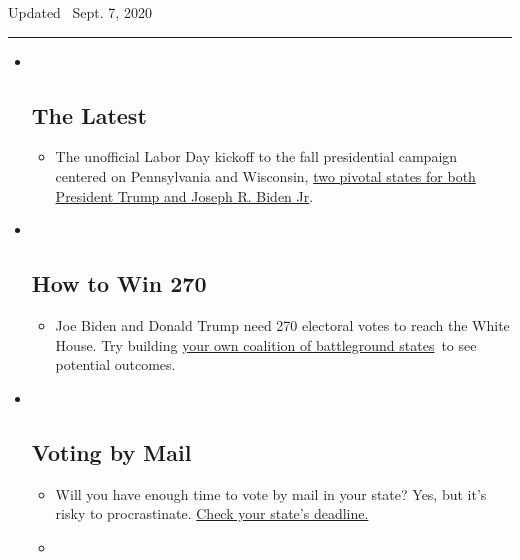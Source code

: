Updated ~Sept. 7, 2020

\begin{center}\rule{0.5\linewidth}{\linethickness}\end{center}

\begin{itemize}
\item ~
  \hypertarget{the-latest}{%
  \subsection{The Latest}\label{the-latest}}

  \begin{itemize}
  \item
    The unofficial Labor Day kickoff to the fall presidential campaign
    centered on Pennsylvania and Wisconsin,
    \href{https://www.nytimes3xbfgragh.onion/2020/09/07/us/politics/wisconsin-biden-harris-trump-pence.html?action=click\&pgtype=Article\&state=default\&region=BELOW_MAIN_CONTENT\&context=storylines_guide}{two
    pivotal states for both President Trump and Joseph R. Biden Jr}.
  \end{itemize}
\item ~
  \hypertarget{how-to-win-270}{%
  \subsection{How to Win 270}\label{how-to-win-270}}

  \begin{itemize}
  \item
    Joe Biden and Donald Trump need 270 electoral votes to reach the
    White House. Try building
    \href{https://www.nytimes3xbfgragh.onion/interactive/2020/us/elections/election-states-biden-trump.html?action=click\&pgtype=Article\&state=default\&region=BELOW_MAIN_CONTENT\&context=storylines_guide}{your
    own coalition of battleground states}~to see potential outcomes.
  \end{itemize}
\item ~
  \hypertarget{voting-by-mail}{%
  \subsection{Voting by Mail}\label{voting-by-mail}}

  \begin{itemize}
  \item
    Will you have enough time to vote by mail in your state? Yes, but
    it's risky to procrastinate.
    \href{https://www.nytimes3xbfgragh.onion/interactive/2020/08/31/us/politics/vote-by-mail-deadlines.html?action=click\&pgtype=Article\&state=default\&region=BELOW_MAIN_CONTENT\&context=storylines_guide}{Check
    your state's deadline.}
  \item
    \href{https://www.nytimes3xbfgragh.onion/interactive/2020/us/elections/joe-biden.html?action=click\&pgtype=Article\&state=default\&region=BELOW_MAIN_CONTENT\&context=storylines_guide}{}


\end{itemize}
\end{itemize}
